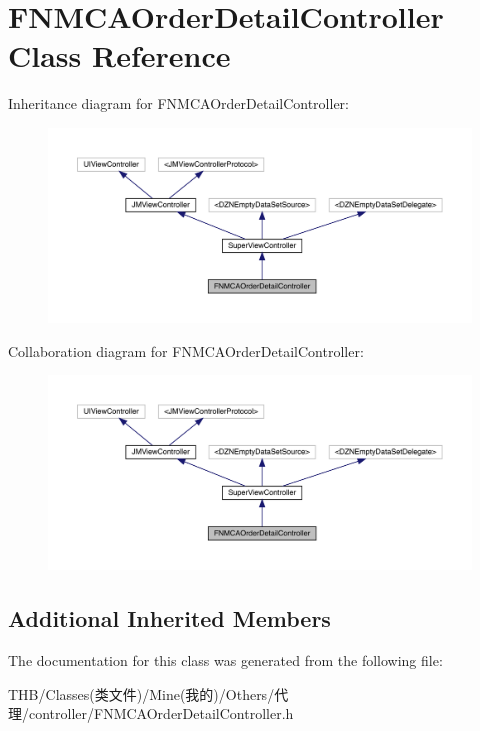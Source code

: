 \hypertarget{interface_f_n_m_c_a_order_detail_controller}{}\section{F\+N\+M\+C\+A\+Order\+Detail\+Controller Class Reference}
\label{interface_f_n_m_c_a_order_detail_controller}


Inheritance diagram for F\+N\+M\+C\+A\+Order\+Detail\+Controller\+:\nopagebreak
\begin{figure}[H]
\begin{center}
\leavevmode
\includegraphics[width=350pt]{interface_f_n_m_c_a_order_detail_controller__inherit__graph}
\end{center}
\end{figure}


Collaboration diagram for F\+N\+M\+C\+A\+Order\+Detail\+Controller\+:\nopagebreak
\begin{figure}[H]
\begin{center}
\leavevmode
\includegraphics[width=350pt]{interface_f_n_m_c_a_order_detail_controller__coll__graph}
\end{center}
\end{figure}
\subsection*{Additional Inherited Members}


The documentation for this class was generated from the following file\+:\begin{DoxyCompactItemize}
\item 
T\+H\+B/\+Classes(类文件)/\+Mine(我的)/\+Others/代理/controller/F\+N\+M\+C\+A\+Order\+Detail\+Controller.\+h\end{DoxyCompactItemize}
